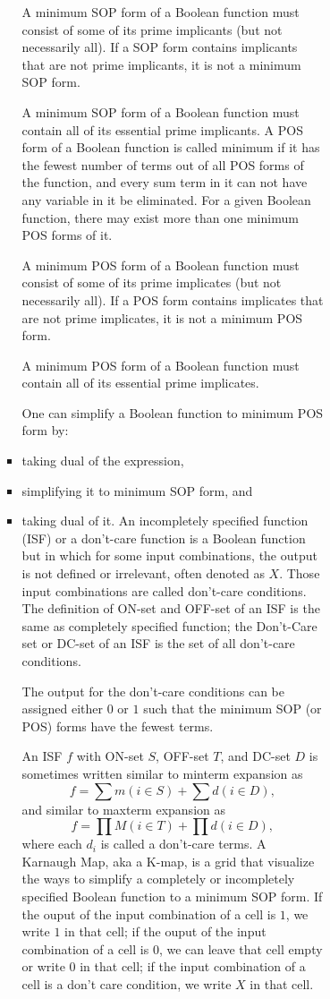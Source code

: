 \documentclass[a4paper,12pt]{article}
\begin{document}
\begin{itemize}
\begin{itemize}
\begin{itemize}
\begin{itemize}
\begin{itemize}
\begin{itemize}
\begin{itemize}
A minimum SOP form of a Boolean function must consist of some of its prime implicants (but not necessarily all). If a SOP form contains implicants that are not prime implicants, it is not a minimum SOP form.

A minimum SOP form of a Boolean function must contain all of its essential prime implicants.
A POS form of a Boolean function is called minimum if it has the fewest number of terms out of all POS forms of the function, and every sum term in it can not have any variable in it be eliminated. For a given Boolean function, there may exist more than one minimum POS forms of it.

A minimum POS form of a Boolean function must consist of some of its prime implicates (but not necessarily all). If a POS form contains implicates that are not prime implicates, it is not a minimum POS form.

A minimum POS form of a Boolean function must contain all of its essential prime implicates.

One can simplify a Boolean function to minimum POS form by:
\ben
\item taking dual of the expression,
\item simplifying it to minimum SOP form, and
\item taking dual of it.
\een
{}
An incompletely specified function (ISF) or a don't-care function is a Boolean function but in which for some input combinations, the output is not defined or irrelevant, often denoted as $X$. Those input combinations are called don't-care conditions. The definition of ON-set and OFF-set of an ISF is the same as completely specified function; the Don't-Care set or DC-set of an ISF is the set of all don't-care conditions.

The output for the don't-care conditions can be assigned either $0$ or $1$ such that the minimum SOP (or POS) forms have the fewest terms.

An ISF $f$ with ON-set $S$, OFF-set $T$, and DC-set $D$ is sometimes written similar to minterm expansion as
\[f=\sum m(i\in S)+\sum d(i\in D),\]
and similar to maxterm expansion as
\[f=\prod M(i\in T)+\prod d(i\in D),\]
where each $d_i$ is called a don't-care terms.
A Karnaugh Map, aka a K-map, is a grid that visualize the ways to simplify a completely or incompletely specified Boolean function to a minimum SOP form.
If the ouput of the input combination of a cell is $1$, we write $1$ in that cell; if the ouput of the input combination of a cell is $0$, we can leave that cell empty or write $0$ in that cell; if the input combination of a cell is a don't care condition, we write $X$ in that cell.


\end{itemize}
\end{itemize}
\end{itemize}
\end{itemize}
\end{itemize}
\end{itemize}
\end{itemize}
\end{document}
